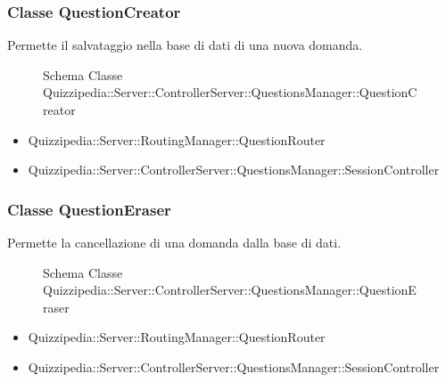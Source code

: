 \subsubsection{Classe QuestionCreator}
Permette il salvataggio nella base di dati di una nuova domanda.
\begin{figure}[H]
\centering
\noindent{}
\caption{Schema Classe Quizzipedia::Server::ControllerServer::QuestionsManager::QuestionCreator}
\end{figure}
\begin{itemize}
\item Quizzipedia::Server::RoutingManager::QuestionRouter
\end{itemize}
\begin{itemize}
\item Quizzipedia::Server::ControllerServer::QuestionsManager::SessionController
\end{itemize}
\subsubsection{Classe QuestionEraser}
Permette la cancellazione di una domanda dalla base di dati.
\begin{figure}[H]
\centering
\noindent{}
\caption{Schema Classe Quizzipedia::Server::ControllerServer::QuestionsManager::QuestionEraser}
\end{figure}
\begin{itemize}
\item Quizzipedia::Server::RoutingManager::QuestionRouter
\end{itemize}
\begin{itemize}
\item Quizzipedia::Server::ControllerServer::QuestionsManager::SessionController
\end{itemize}
